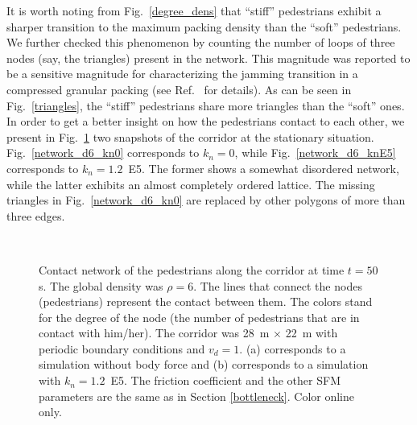\documentclass[preprint,12pt]{elsarticle}
\begin{document}
It is worth noting from Fig.~\ref{degree_dens} that ``stiff''
pedestrians exhibit a sharper transition to the maximum packing density than 
the ``soft'' pedestrians. We further checked this phenomenon by counting the 
number of loops of three nodes (say, the triangles) present in the network. 
This magnitude was reported to be a sensitive magnitude for characterizing the 
jamming transition in a compressed granular packing (see 
Ref.~\cite{pugnaloni_2013} for details).  As can be seen in 
Fig.~\ref{triangles}, the ``stiff'' pedestrians share more triangles 
than the ``soft'' ones.   \\

In order to get a better insight on how the pedestrians contact to each other, 
we present in Fig.~\ref{network_corridor} two snapshots of the corridor at the 
stationary situation. Fig.~\ref{network_d6_kn0} corresponds to 
$k_n=0$, while Fig.~\ref{network_d6_knE5} corresponds to $k_n=1.2$~E5. The 
former shows a somewhat disordered network, while the latter exhibits an almost 
completely ordered lattice. The missing triangles in Fig.~\ref{network_d6_kn0} 
are replaced by other polygons of more than three edges.    \\


\begin{figure}[!htbp]
\centering
    \ 
    \\
\caption[width=0.47\columnwidth]{Contact network of the pedestrians along the corridor at time $t=50\,$s. The global density was $\rho=6$.  The lines that connect the nodes (pedestrians) represent the contact between them. The colors stand for the degree of the node (the number of pedestrians that are in contact with him/her). The corridor was 28~m $\times$ 22~m with periodic boundary conditions and $v_d=1$. (a) corresponds to a simulation without body force and (b) corresponds to a simulation with $k_n=1.2$~E5. The friction coefficient and the other SFM parameters are the same as in Section \ref{bottleneck}. Color online only.}
\label{network_corridor}
\end{figure}
\end{document}
